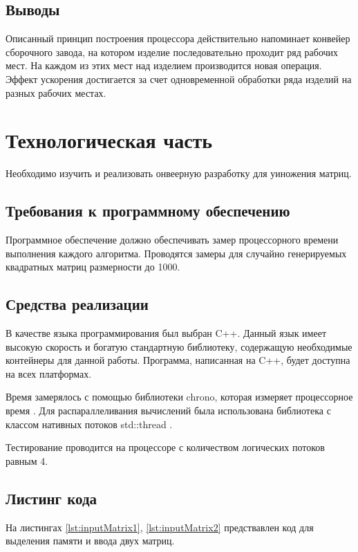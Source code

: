 \documentclass[a4paper,12pt]{article}
\begin{document}
\subsection{Выводы}

Описанный принцип построения процессора действительно напоминает конвейер сборочного завода, на котором изделие последовательно проходит ряд рабочих мест. На каждом из этих мест над изделием производится новая операция. Эффект ускорения достигается за счет одновременной обработки ряда изделий на разных рабочих местах.

\newpage
\section{Технологическая часть}

Необходимо изучить и реализовать онвеерную разработку для уиножения матриц.

\subsection{Требования к программному обеспечению}

Программное обеспечение должно обеспечивать замер процессорного времени выполнения
каждого алгоритма. Проводятся замеры для случайно генерируемых квадратных матриц
размерности до 1000.

\subsection{Средства реализации}

В качестве языка программирования был выбран {\ttfamily C++}.
Данный язык имеет высокую скорость и богатую стандартную библиотеку,
содержащую необходимые контейнеры для данной работы. Программа, написанная на
{\ttfamily C++}, будет доступна на всех платформах.

Время замерялось с помощью библиотеки {\ttfamily chrono}, которая измеряет
процессорное время \cite{chrono}. Для распараллеливания вычислений была
использована библиотека с классом нативных потоков
{\ttfamily std::thread} \cite{thread}.

Тестирование проводится на процессоре с количеством логических потоков равным 4.

\subsection{Листинг кода}

На листингах \ref{lst:inputMatrix1}, \ref{lst:inputMatrix2} предствавлен код для
выделения памяти и ввода двух матриц.
\end{document}
